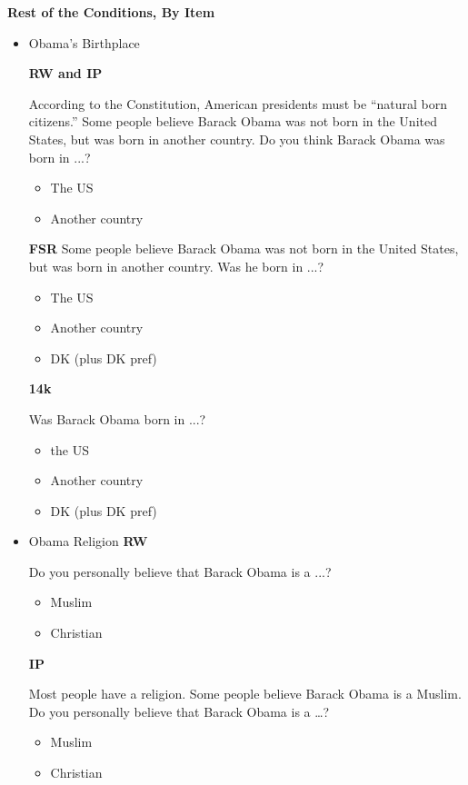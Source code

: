 \documentclass[12pt, letterpaper]{article}
\begin{document}
\textbf{Rest of the Conditions, By Item}

\begin{itemize}
\item Obama's Birthplace

\textbf{RW and IP}\newline

According to the Constitution, American presidents must be ``natural born citizens.''
Some people believe Barack Obama was not born in the United States, but was born
in another country. Do you think Barack Obama was born in ...?
\begin{itemize}
	\item The US
	\item Another country
\end{itemize}

\textbf{FSR}\newline
Some people believe Barack Obama was not born in the United States, but was born
in another country. Was he born in ...?
\begin{itemize}
	\item The US
	\item Another country
	\item DK (plus DK pref)
\end{itemize}

\textbf{14k}\newline

Was Barack Obama born in ...?
\begin{itemize}
	\item the US
	\item Another country
	\item DK (plus DK pref)
\end{itemize}

\item Obama Religion\newline
\textbf{RW}\newline

Do you personally believe that Barack Obama is a ...?
\begin{itemize}
	\item Muslim
	\item Christian
\end{itemize}

\textbf{IP}\newline

Most people have a religion. Some people believe Barack Obama is a Muslim. Do
you personally believe that Barack Obama is a \ldots?
\begin{itemize}
	\item Muslim
	\item Christian
\end{itemize}


\end{itemize}
\end{document}
